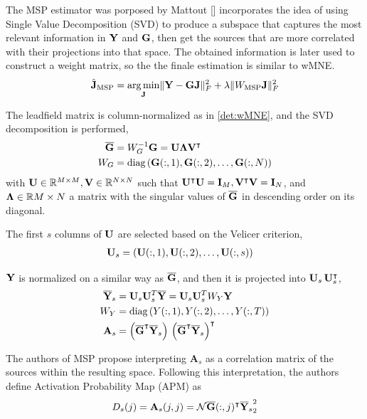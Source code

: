 The MSP estimator was porposed by Mattout []
incorporates the idea of using Single Value Decomposition (SVD) to produce a subspace that captures the most relevant information in $\mathbf{Y}$ and $\mathbf{G}$, then get the sources that are more correlated with their projections into that space.
%
The obtained information is later used to construct a weight matrix, so the the finale estimation is similar to wMNE.
\begin{equation}
\hat{\mathbf{J}}_\text{MSP} = \operatorname*{arg\,min}_{\mathbf{J}} \lVert \mathbf{Y} - \mathbf{G} \mathbf{J} \rVert_F^2 + \lambda\lVert W_\text{MSP} \mathbf{J} \rVert_F^2
\end{equation}

The leadfield matrix is column-normalized as in \ref{det:wMNE}, and the SVD decomposition is performed, 
\begin{align}
\overline{\mathbf{G}} &= W_G^{-1} \mathbf{G} = \mathbf{U} \mathbf{\Lambda} \mathbf{V}^\intercal
\\
W_G &= \text{diag}\left(   \mathbf{G}(:,1), \mathbf{G}(:,2), \dots, \mathbf{G}(:,N)   \right)
\end{align}
with $\mathbf{U}\in \mathbb{R}^{M\times M},\mathbf{V}\in \mathbb{R}^{N\times N}$ such that $\mathbf{U}^\intercal \mathbf{U} = \mathbf{I}_M, \mathbf{V}^\intercal\mathbf{V} = \mathbf{I}_N$, and $\mathbf{\Lambda} \in \mathbb{R}{M\times N}$ a matrix with the singular values of $\overline{\mathbf{G}}$ in descending order on its diagonal.

The first $s$ columns of $\mathbf{U}$ are selected based on the Velicer criterion,
\begin{align}
\mathbf{U}_s 
&= 
\left(  \mathbf{U}(:,1), \mathbf{U}(:,2), \dots, \mathbf{U}(:,s)  \right)
\end{align}

$\mathbf{Y}$ is normalized on a similar way as $\overline{\mathbf{G}}$, and then it is projected into $\mathbf{U}_s\, \mathbf{U}_s^\intercal$,
\begin{align}
\overline{\mathbf{Y}}_s 
&=
\mathbf{U}_s \mathbf{U}_s^T \overline{\mathbf{Y}} = \mathbf{U}_s \mathbf{U}_s^T W_Y \mathbf{Y}
\\
W_Y &= \text{diag}\left(   Y(:,1), Y(:,2), \dots, Y(:,T)   \right)
\\
\mathbf{A}_s &= \left( \overline{\mathbf{G}}^\intercal \overline{\mathbf{Y}}_s \right)\, \left( \overline{\mathbf{G}}^\intercal \overline{\mathbf{Y}}_s \right)^\intercal
\end{align}

The authors of MSP propose interpreting $\mathbf{A}_s$ as a correlation matrix of the sources within the resulting space.
%
Following this interpretation, the authors define {Activation Probability Map} (APM) as
\begin{align}
{D}_s(j) = \mathbf{A}_s(j,j) = \mathcal{N}{\overline{\mathbf{G}}(:,j)^\intercal \overline{\mathbf{Y}}_s  }_2^2
\end{align}

